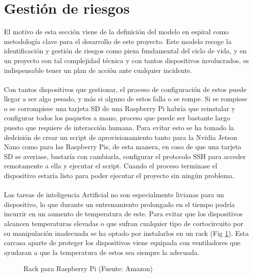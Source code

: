 \section{Gestión de riesgos}\label{GestionRiesgos}
El motivo de esta sección viene de la definición del modelo en espiral como metodología clave para el desarrollo de este proyecto. Este modelo recoge la identificación y gestión de riesgos como pieza fundamental del ciclo de vida, y en un proyecto con tal complejidad técnica y con tantos dispositivos involucrados, es indispensable tener un plan de acción ante cualquier incidente.
\\ \\
Con tantos dispositivos que gestionar, el proceso de configuración de estos puede llegar a ser algo pesado, y más si alguno de estos falla o se rompe. Si se rompiese o se corrompiese una tarjeta SD de una Raspberry Pi habría que reinstalar y configurar todos los paquetes a mano, proceso que puede ser bastante largo puesto que requiere de interacción humana. Para evitar esto se ha tomado la dedcisión de crear un script de aprovisionamiento tanto para la Nvidia Jetson Nano como para las Raspberry Pis, de esta manera, en caso de que una tarjeta SD se averiase, bastaría con cambiarla, configurar el protocolo SSH para acceder remotamente a ella y ejecutar el script. Cuando el proceso terminase el dispositivo estaría listo para poder ejecutar el proyecto sin ningún problema.
\\ \\
Las tareas de inteligencia Artificial no son especialmente livianas para un dispositivo, lo que durante un entrenamiento prolongado en el tiempo podría incurrir en un aumento de temperatura de este. Para evitar que los dispositivos alcancen temperaturas elevadas o que sufran cualquier tipo de cortocircuito por su manipulación inadecuada se ha optado por instalarlos en un rack (Fig \ref{fig:RackRaspberry}). Esta carcasa aparte de proteger los dispositivos viene equipada con ventiladores que ayudaran a que la temperatura de estos sea siempre la adecuada.

\begin{figure}[thbp]
    \centering
    \caption{Rack para Raspberry Pi (Fuente: Amazon\autocite{ParaRaspberryPi})}
    \label{fig:RackRaspberry}
\end{figure}

